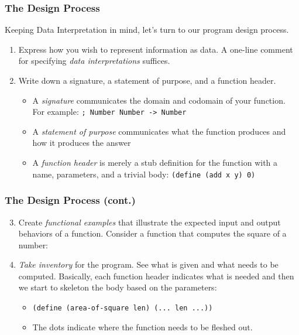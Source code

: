 \documentclass{beamer}
\begin{document}
\begin{frame}
  \frametitle{The Design Process}
  Keeping Data Interpretation in mind, let's turn to our program design process.
  \begin{enumerate}
  \item<2-> Express how you wish to represent information as data. A one-line comment for specifying \emph{data interpretations} suffices.
  \item<3-> Write down a signature, a statement of purpose, and a function header.
    \begin{itemize}
    \item<4-> A \emph{signature} communicates the domain and codomain of your function. For example: \texttt{; Number Number -> Number}
    \item<5-> A \emph{statement of purpose} communicates what the function produces and how it produces the answer
    \item<6-> A \emph{function header} is merely a stub definition for the function with a name, parameters, and a trivial body: \texttt{(define (add x y) 0)}
    \end{itemize}    
  \end{enumerate}
\end{frame}



\begin{frame}
  \frametitle{The Design Process (cont.)}
  \begin{enumerate}
    \setcounter{enumi}{2}
  \item Create \emph{functional examples} that illustrate the expected input and output behaviors of a function. Consider a function that computes the square of a number: \squareExample
  \item<2-> \emph{Take inventory} for the program. See what is given and what needs to be computed. Basically, each function header indicates
    what is needed and then we start to skeleton the body based on the parameters:
    \begin{itemize}
    \item<3-> \texttt{(define (area-of-square len) (... len ...))}
    \item<4-> The dots indicate where the function needs to be fleshed out.    
    \end{itemize}
  \end{enumerate}
\end{frame}
\end{document}
